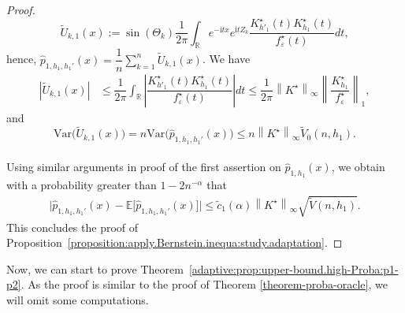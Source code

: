 \documentclass[11pt,a4paper,openany]{article}
\newcommand{\Var}{\mbox{Var}}
\def\R{\mathbb{R}}
\def\E{\mathbb{E}}
\begin{document}
\begin{proof}
	\[  
	\widetilde{U}_{k , 1}(x) := \sin(\Theta_k) \dfrac{1}{2\pi} \displaystyle{ \int_{\R} } e^{-\mathrm{i} tx} e^{\mathrm{i} t Z_{k}} \dfrac{  K_{h'_{1}}^\star(t)   K_{h_{1}}^\star(t) }{ f^{\star}_\varepsilon(t) } dt, \]
	hence, $\widehat{p}_{1,h_{1}, h_{1}'}(x) = \dfrac{1}{n}\sum_{k=1}^{n} \widetilde{U}_{k , 1}( x )$.
	We have   	
	\begin{align*} 
		\left| \widetilde{U}_{k,1} (x) \right|   
		&\leq \dfrac{1}{2\pi} \displaystyle{ \int_{\R} } \left|  \dfrac{  K_{h'_{1}}^\star(t)   K_{h_{1}}^\star(t) }{ f^{\star}_\varepsilon(t) } \right| dt  
	\leq    \dfrac{1}{2\pi}  \left\| K^{\star} \right\|_{\infty}     \left\| \dfrac{ K_{h_{1}}^\star }{ f^{\star}_\varepsilon } \right\|_{1},
	\end{align*}
	and $$\Var \big( \widetilde{U}_{k,1}(x) \big)  =  n  \Var\big(\widehat{p}_{1,h_{1},h_{1}'}(x) \big)  \leq  n  \left\| K^{\star} \right\|_{\infty} \widetilde V_{0}(n,h_{1}).$$\\
	Using similar arguments in proof of the first assertion on $\widehat{p}_{1, h_{1}}(x)$, we obtain with a probability greater than $1 - 2n^{-\alpha}$ that
	\begin{align*}
		\big| \widehat{p}_{1, h_{1} ,h_{1}'}(x) - \E \big[ \widehat{p}_{1, h_{1} ,h_{1}'}(x) \big] \big|    \leq   \tilde c_{1}(\alpha)   \left\| K^{\star} \right\|_{\infty}    \sqrt{\widetilde{V}(n,h_{1})} .
	\end{align*}
	This concludes the proof of Proposition~\ref{proposition:apply.Bernstein.inequa:study.adaptation}.
\end{proof}
\medskip


Now, we can start to prove Theorem~\ref{adaptive:prop:upper-bound.high-Proba:p1-p2}. As the proof is similar to the proof of Theorem  \ref{theorem-proba-oracle}, we will omit some computations. 
\end{document}
